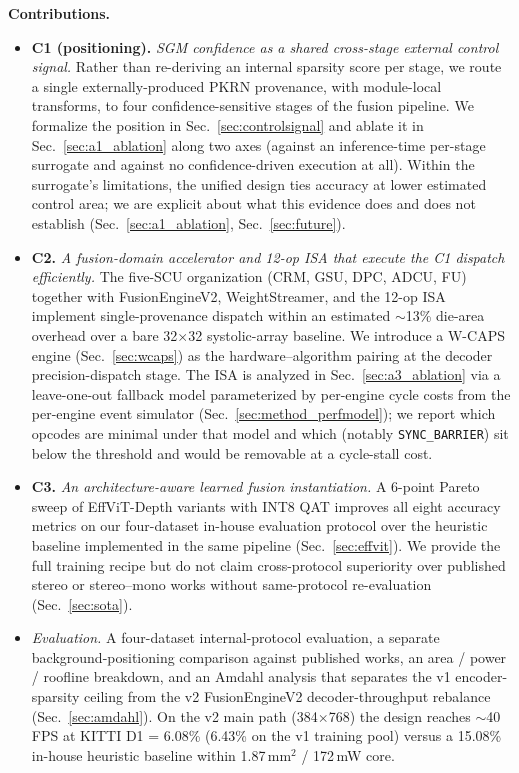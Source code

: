 \documentclass[journal]{IEEEtran}
\begin{document}
\textbf{Contributions.}
\begin{itemize}
\item \textbf{C1 (positioning).} \emph{SGM confidence as a shared cross-stage external control signal.} Rather than re-deriving an internal sparsity score per stage, we route a single externally-produced PKRN provenance, with module-local transforms, to four confidence-sensitive stages of the fusion pipeline. We formalize the position in Sec.~\ref{sec:controlsignal} and ablate it in Sec.~\ref{sec:a1_ablation} along two axes (against an inference-time per-stage surrogate and against no confidence-driven execution at all). Within the surrogate's limitations, the unified design ties accuracy at lower estimated control area; we are explicit about what this evidence does and does not establish (Sec.~\ref{sec:a1_ablation}, Sec.~\ref{sec:future}).
\item \textbf{C2.} \emph{A fusion-domain accelerator and 12-op ISA that execute the C1 dispatch efficiently.} The five-SCU organization (CRM, GSU, DPC, ADCU, FU) together with FusionEngineV2, WeightStreamer, and the 12-op ISA implement single-provenance dispatch within an estimated $\sim$13\% die-area overhead over a bare 32$\times$32 systolic-array baseline. We introduce a W-CAPS engine (Sec.~\ref{sec:wcaps}) as the hardware--algorithm pairing at the decoder precision-dispatch stage. The ISA is analyzed in Sec.~\ref{sec:a3_ablation} via a leave-one-out fallback model parameterized by per-engine cycle costs from the per-engine event simulator (Sec.~\ref{sec:method_perfmodel}); we report which opcodes are minimal under that model and which (notably \texttt{SYNC\_BARRIER}) sit below the threshold and would be removable at a cycle-stall cost.
\item \textbf{C3.} \emph{An architecture-aware learned fusion instantiation.} A 6-point Pareto sweep of EffViT-Depth variants with INT8 QAT improves all eight accuracy metrics on our four-dataset in-house evaluation protocol over the heuristic baseline implemented in the same pipeline (Sec.~\ref{sec:effvit}). We provide the full training recipe but do not claim cross-protocol superiority over published stereo or stereo--mono works without same-protocol re-evaluation (Sec.~\ref{sec:sota}).
\item \emph{Evaluation.} A four-dataset internal-protocol evaluation, a separate background-positioning comparison against published works, an area / power / roofline breakdown, and an Amdahl analysis that separates the v1 encoder-sparsity ceiling from the v2 FusionEngineV2 decoder-throughput rebalance (Sec.~\ref{sec:amdahl}). On the v2 main path (384$\times$768) the design reaches $\sim$40\,FPS at KITTI D1 = 6.08\% (6.43\% on the v1 training pool) versus a 15.08\% in-house heuristic baseline within 1.87\,mm$^2$ / 172\,mW core.
\end{itemize}
\end{document}
